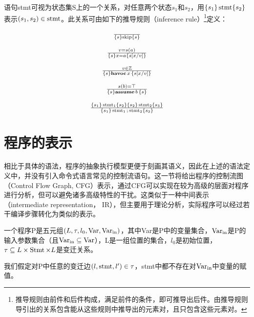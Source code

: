 \begin{definition}
  \label{def:chap2-semantics}
  语句stmt可视为状态集S上的一个关系，对任意两个状态$s_1$和$s_2$，用$\{ s_1 \} \operatorname{stmt} \{ s_2 \}$表示$(s_1, s_2) \in \operatorname{stmt}$。此关系可由如下的推导规则（inference rule）\footnote{推导规则由前件和后件构成，满足前件的条件，即可推导出后件。由推导规则导引出的关系包含能从这些规则中推导出的元素对，且只包含这些元素对。}定义：
  
  \[ \begin{array}{c}
       \frac{}{\{ s \} \mathbf{\operatorname{skip}} \{ s \}}\\
       \\
       \frac{v = s (a)}{\{ s \} x = a \{ s [x / v] \}}\\
       \\
       \frac{v \in \mathbb{Z}}{\{ s \} \mathbf{havoc} \, x \, \{ s [x / v]
       \}}\\
       \\
       \frac{s (b) = \top}{\{ s \} \mathbf{assume} \,b \, \{ s \}}\\
       \\
       \frac{\{ s_1 \} \operatorname{stmt}_1 \{ s_2 \} \relax \{ s_2 \} \operatorname{stmt}_2
       \{ s_3 \}}{\{ s_1 \} \operatorname{stmt}_1 \mathbf{;} \operatorname{stmt}_2 \{ s_3
       \}}
     \end{array} \]
\end{definition}

\section{程序的表示}

相比于具体的语法，程序的抽象执行模型更便于刻画其语义，因此在上述的语法定义中，并没有引入命令式语言常见的控制流语句。这一节将给出程序的控制流图（Control
Flow Graph,
CFG）表示，通过CFG可以实现在较为高级的层面对程序进行分析，但可以避免诸多高级特性的干扰。这类似于一种中间表示（intermediate
representation，
IR），但主要用于理论分析，实际程序可以经过若干编译步骤转化为类似的表示。

\begin{definition}
  \label{def:chap2-program}
  一个程序P是五元组$(L, \tau, l_0, \operatorname{Var},
  \operatorname{Var}_{\operatorname{in}})$，其中Var是P中的变量集合，$\operatorname{Var}_{\operatorname{in}}$是P的输入参数集合（且$\operatorname{Var}_{\operatorname{in}}
  \subseteq
  \operatorname{Var}$），L是一组位置的集合，$l_0$是初始位置，$\tau
  \subseteq L \times \operatorname{Stmt} \times L$是变迁关系。
  
  我们假定对P中任意的变迁边$(l, \operatorname{stmt}, l') \in
  \tau$，stmt中都不存在对$\operatorname{Var}_{\operatorname{in}}$中变量的赋值。
\end{definition}


